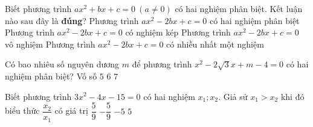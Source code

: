\begin{bt}
	Biết phương trình $ax^2+bx+c=0\ (a\ne 0)$ có hai nghiệm phân biệt. Kết luận nào sau đây là \textbf{đúng}?
	\choice
	{\True Phương trình $ax^2-2bx+c=0$ có hai nghiệm phân biệt}
	{Phương trình $ax^2-2bx+c=0$ có nghiệm kép}
	{Phương trình $ax^2-2bx+c=0$ vô nghiệm}
	{Phương trình $ax^2-2bx+c=0$ có nhiều nhất một nghiệm}
\end{bt}
\begin{bt}
	Có bao nhiêu số nguyên dương $m$ để phương trình $x^2-2\sqrt{3}x+m-4=0$ có hai nghiệm phân biệt?
	\choice
	{Vố số}
	{$5$}
	{\True $6$}
	{$7$}
\end{bt}
\begin{bt}
	Biết phương trình $3x^2-4x-15=0$ có hai nghiệm $x_1;x_2$. Giả sử $x_1>x_2$ khi đó biểu thức $\dfrac{x_2}{x_1}$ có giá trị 
	\choice
	{$\dfrac{5}{9}$}
	{\True $-\dfrac{5}{9}$}
	{$-5$}
	{$5$}
\end{bt}
